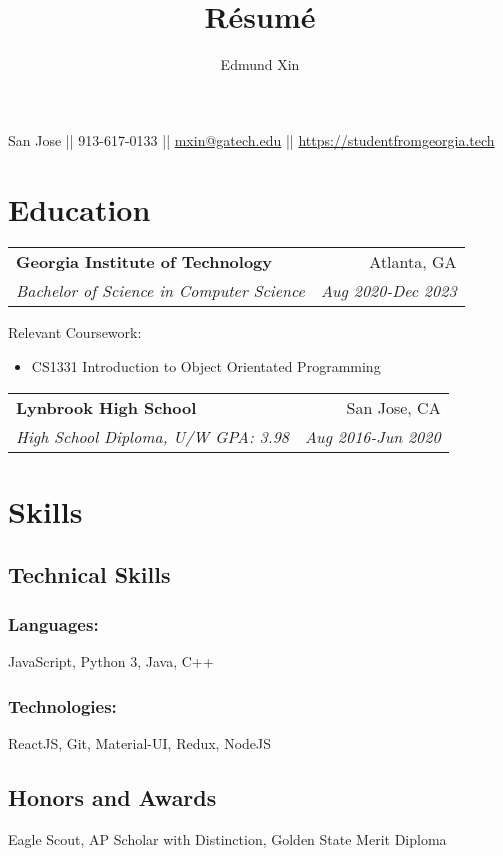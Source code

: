\documentclass[letterpaper,8pt]{article}
\makeatletter
\renewcommand{\maketitle}{
  \begin{center}
  {\huge\bfseries
  \theauthor}

  \vspace{0.25em}

  San Jose || 913-617-0133 || \href{mailto:mxin@gatech.edu}{mxin@gatech.edu} || \href{https://studentfromgeorgia.tech}{https://studentfromgeorgia.tech}

  \end{center}
}
\newcommand{\resumeSubheading}[4]{
  \vspace{0.25em}
  \begin{tabular*}{1\textwidth}[t]{l@{\extracolsep{\fill}}r}
    \textbf{#1} & #2 \\
    \textit{#3} & \textit{#4} \\
  \end{tabular*}\vspace{-5pt}
}
\makeatother
\begin{document}
\title{R\'esum\'e}
\author{Edmund Xin}

\maketitle

\section{Education}

\resumeSubheading{Georgia Institute of Technology}
{Atlanta, GA}{Bachelor of Science in Computer Science
}{Aug 2020-Dec 2023}

Relevant Coursework:

\begin{itemize}[label=\raisebox{0.25ex}{\tiny$\bullet$}]
  \item CS1331 Introduction to Object Orientated Programming
\end{itemize}
\vspace{5pt}


\resumeSubheading{Lynbrook High School}
{San Jose, CA}{High School Diploma, U/W GPA: 3.98}{Aug 2016-Jun 2020}

\section{Skills}

\begin{multicols}{2}
\subsection{Technical Skills}

\subsubsection{Languages:}

JavaScript, Python 3, Java, C++

\subsubsection{Technologies:}

ReactJS, Git, Material-UI, Redux, NodeJS

\columnbreak


\subsection{Honors and Awards}
Eagle Scout, AP Scholar with Distinction, Golden State Merit Diploma

\end{multicols}
\end{document}
